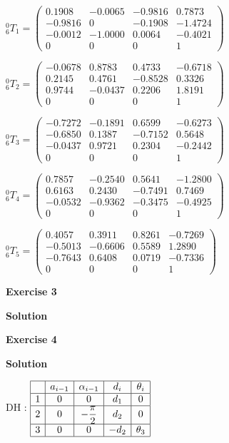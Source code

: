 \documentclass[8pt]{article}
\begin{document}
\begin{list}{()~}{}
\item

$^0_6T_1 = \left( \begin{array}{cccc}
0.1908 & -0.0065 & -0.9816 & 0.7873\\
-0.9816 & 0 & -0.1908 & -1.4724\\
-0.0012 & -1.0000 & 0.0064 & -0.4021\\
0 & 0 & 0 & 1
\end{array} \right) $

$^0_6T_2 = \left( \begin{array}{cccc}
-0.0678 & 0.8783 &  0.4733 & -0.6718\\
0.2145 & 0.4761 & -0.8528 & 0.3326\\
0.9744 & -0.0437 & 0.2206 & 1.8191\\
0 & 0 & 0 & 1
\end{array} \right) $

$^0_6T_3 = \left( \begin{array}{cccc}
-0.7272&-0.1891&0.6599&-0.6273\\
-0.6850&0.1387&-0.7152&0.5648\\
-0.0437&0.9721&0.2304&-0.2442\\
0&0&0&1
\end{array} \right) $

$^0_6T_4 = \left( \begin{array}{cccc}
0.7857&-0.2540&0.5641&-1.2800\\
0.6163&0.2430&-0.7491&0.7469\\
-0.0532&-0.9362&-0.3475&-0.4925\\
0&0&0&1
\end{array} \right) $
    
$^0_6T_5 = \left( \begin{array}{cccc}
0.4057&0.3911&0.8261&-0.7269\\
-0.5013&-0.6606&0.5589&1.2890\\
-0.7643&0.6408&0.0719&-0.7336\\
0&0&0&1
\end{array} \right) $

\newpage

\textbf{Exercise 3}		
		
\textbf{Solution}



\newpage

\textbf{Exercise 4}		
		
\textbf{Solution}

DH :
$ \begin{array}{|c|c|c|c|c|}
\hline
& a_{i-1} & \alpha_{i-1} & d_i & \theta_i\\
\hline
1 & 0 & 0 & d_1 & 0 \\
\hline
2 & 0 & -\dfrac{\pi}{2} & d_2 & 0 \\
\hline
3 & 0 & 0 & -d_2 & \theta_3\\
\hline
\end{array} $



\end{list}
\end{document}
